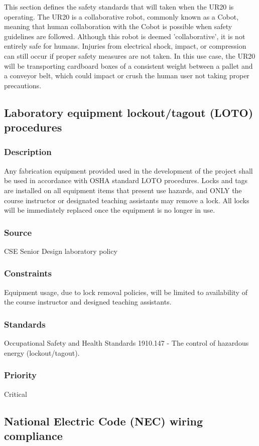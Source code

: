 This section defines the safety standards that will taken when the UR20 is operating. The UR20 is a collaborative robot, commonly known as a Cobot, meaning that human collaboration with the Cobot is possible when safety guidelines are followed. Although this robot is deemed 'collaborative', it is not entirely safe for humans. Injuries from electrical shock, impact, or compression can still occur if proper safety measures are not taken. In this use case, the UR20 will be transporting cardboard boxes of a consistent weight between a pallet and a conveyor belt, which could impact or crush the human user not taking proper precautions.

\subsection{Laboratory equipment lockout/tagout (LOTO) procedures}
\subsubsection{Description}
Any fabrication equipment provided used in the development of the project shall be used in accordance with OSHA standard LOTO procedures. Locks and tags are installed on all equipment items that present use hazards, and ONLY the course instructor or designated teaching assistants may remove a lock. All locks will be immediately replaced once the equipment is no longer in use.
\subsubsection{Source}
CSE Senior Design laboratory policy
\subsubsection{Constraints}
Equipment usage, due to lock removal policies, will be limited to availability of the course instructor and designed teaching assistants.
\subsubsection{Standards}
Occupational Safety and Health Standards 1910.147 - The control of hazardous energy (lockout/tagout).
\subsubsection{Priority}
Critical

\subsection{National Electric Code (NEC) wiring compliance}
